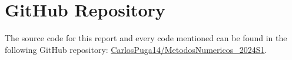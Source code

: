 \section{GitHub Repository}\label{sec:github}
 The source code for this report and every code mentioned can be found in the following GitHub repository: \href{https://github.com/CarlosPuga14/MetodosNumericos_2024S1}{CarlosPuga14/MetodosNumericos\_2024S1}.

